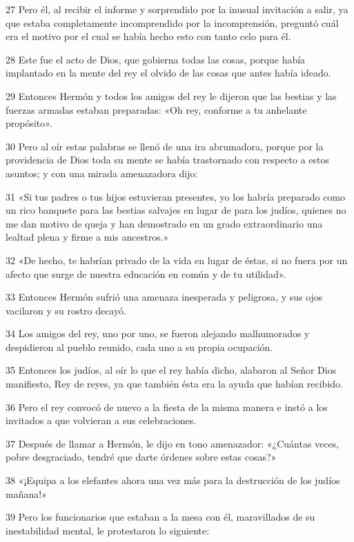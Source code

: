 \par 27 Pero él, al recibir el informe y sorprendido por la inusual invitación a salir, ya que estaba completamente incomprendido por la incomprensión, preguntó cuál era el motivo por el cual se había hecho esto con tanto celo para él.
\par 28 Este fue el acto de Dios, que gobierna todas las cosas, porque había implantado en la mente del rey el olvido de las cosas que antes había ideado.
\par 29 Entonces Hermón y todos los amigos del rey le dijeron que las bestias y las fuerzas armadas estaban preparadas: «Oh rey, conforme a tu anhelante propósito».
\par 30 Pero al oír estas palabras se llenó de una ira abrumadora, porque por la providencia de Dios toda su mente se había trastornado con respecto a estos asuntos; y con una mirada amenazadora dijo:
\par 31 «Si tus padres o tus hijos estuvieran presentes, yo los habría preparado como un rico banquete para las bestias salvajes en lugar de para los judíos, quienes no me dan motivo de queja y han demostrado en un grado extraordinario una lealtad plena y firme a mis ancestros.»
\par 32 «De hecho, te habrían privado de la vida en lugar de éstas, si no fuera por un afecto que surge de nuestra educación en común y de tu utilidad».
\par 33 Entonces Hermón sufrió una amenaza inesperada y peligrosa, y sus ojos vacilaron y su rostro decayó.
\par 34 Los amigos del rey, uno por uno, se fueron alejando malhumorados y despidieron al pueblo reunido, cada uno a su propia ocupación.
\par 35 Entonces los judíos, al oír lo que el rey había dicho, alabaron al Señor Dios manifiesto, Rey de reyes, ya que también ésta era la ayuda que habían recibido.
\par 36 Pero el rey convocó de nuevo a la fiesta de la misma manera e instó a los invitados a que volvieran a sus celebraciones.
\par 37 Después de llamar a Hermón, le dijo en tono amenazador: «¿Cuántas veces, pobre desgraciado, tendré que darte órdenes sobre estas cosas?»
\par 38 «¡Equipa a los elefantes ahora una vez más para la destrucción de los judíos mañana!»
\par 39 Pero los funcionarios que estaban a la mesa con él, maravillados de su inestabilidad mental, le protestaron lo siguiente:
